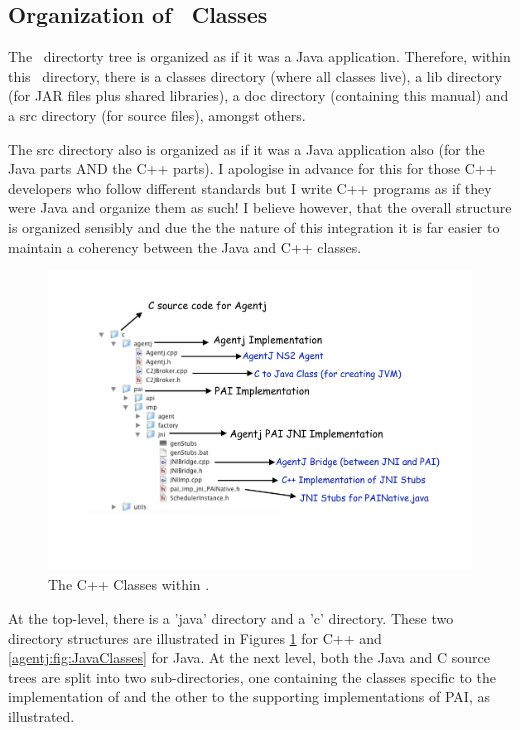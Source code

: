 \subsection{Organization of \agentj~Classes}

The \agentj~directorty tree is organized as if it was a Java application.  Therefore,
within this \agentj~directory, there is a classes directory (where all classes 
live), a lib directory (for JAR files plus shared libraries), a doc directory 
(containing this manual) and a src directory (for source files), amongst 
others. 

The src directory also is organized as if it was a Java application also (for the
Java parts AND the C++ parts).  I apologise in advance for this for those
C++ developers who follow different standards but I write C++ programs
as if they were Java and organize them as such! I believe however, that 
the overall structure is organized sensibly and due the the nature of this 
integration it is far easier to maintain a coherency between the Java and
C++ classes. 

\begin{figure}
\centering
\includegraphics[scale=0.45]{images/agentjCClasses}
\caption{The C++ Classes within \agentj.} 
\label{agentj:fig:CClasses}
\end{figure}

At the top-level, there is a 'java' directory and a 'c' directory. These 
two directory structures are illustrated in Figures \ref{agentj:fig:CClasses} 
for C++ and \ref{agentj:fig:JavaClasses} for Java. At the next level,
both the Java and C source trees are split into two sub-directories,
one containing the classes specific to the implementation of
\agentj and the other to the supporting implementations of
PAI, as illustrated.

